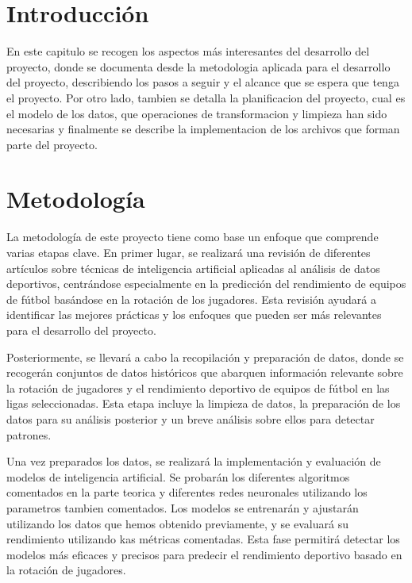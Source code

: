 


\section{Introducción}
En este capitulo se recogen los aspectos más interesantes del desarrollo del proyecto, donde se documenta desde la metodologia aplicada para el desarrollo del proyecto, describiendo los pasos a seguir y el alcance que se espera que tenga el proyecto. Por otro lado, tambien se detalla la planificacion del proyecto, cual es el modelo de los datos, que operaciones de transformacion y limpieza han sido necesarias y finalmente se describe la implementacion de los archivos que forman parte del proyecto.


\section{Metodología}
La metodología de este proyecto tiene como base un enfoque que comprende varias etapas clave. En primer lugar, se realizará una revisión de diferentes artículos sobre técnicas de inteligencia artificial aplicadas al análisis de datos deportivos, centrándose especialmente en la predicción del rendimiento de equipos de fútbol basándose en la rotación de los jugadores. Esta revisión ayudará a identificar las mejores prácticas y los enfoques que pueden ser más relevantes para el desarrollo del proyecto.

Posteriormente, se llevará a cabo la recopilación y preparación de datos, donde se recogerán conjuntos de datos históricos que abarquen información relevante sobre la rotación de jugadores y el rendimiento deportivo de equipos de fútbol en las ligas seleccionadas. Esta etapa incluye la limpieza de datos, la preparación de los datos para su análisis posterior y un breve análisis sobre ellos para detectar patrones.

Una vez preparados los datos, se realizará la implementación y evaluación de modelos de inteligencia artificial. Se probarán los diferentes algoritmos comentados en la parte teorica y diferentes redes neuronales utilizando los parametros tambien comentados. Los modelos se entrenarán y ajustarán utilizando los datos que hemos obtenido previamente, y se evaluará su rendimiento utilizando kas métricas comentadas. Esta fase permitirá detectar los modelos más eficaces y precisos para predecir el rendimiento deportivo basado en la rotación de jugadores.

